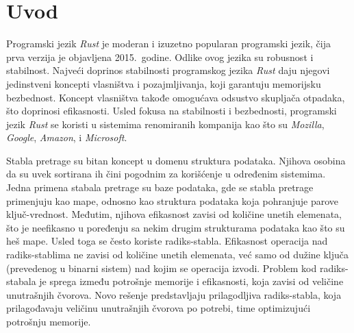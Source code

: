 \documentclass[12pt,oneside]{memoir}
\begin{document}
\frontmatter
\naslovna
\komisija
\apstrakt
\tableofcontents*

\mainmatter

\chapter{Uvod}
Programski jezik \textit{Rust} je moderan i izuzetno popularan programski jezik,
čija prva verzija je objavljena 2015.\ godine. Odlike ovog jezika su
robusnost i stabilnost. Najveći doprinos stabilnosti
programskog jezika \textit{Rust} daju
njegovi jedinstveni koncepti vlasništva i pozajmljivanja, koji garantuju
memorijsku bezbednost. Koncept vlasništva takođe
omogućava odsustvo skupljača otpadaka, što doprinosi efikasnosti.
Usled fokusa na stabilnosti i bezbednosti, programski jezik \textit{Rust}
se koristi u sistemima renomiranih kompanija kao što su
\textit{Mozilla}, \textit{Google}, \textit{Amazon},
i \textit{Microsoft}.

Stabla pretrage su bitan koncept u domenu struktura podataka.
Njihova osobina da su uvek sortirana ih čini pogodnim za korišćenje
u određenim sistemima.
Jedna primena stabala pretrage su baze podataka, gde se stabla pretrage
primenjuju kao mape, odnosno kao struktura podataka koja pohranjuje
parove ključ-vrednost.
Međutim, njihova efikasnost
zavisi od količine unetih elemenata, što je neefikasno u poređenju sa nekim
drugim strukturama podataka kao što su heš mape.
Usled toga se često koriste
radiks-stabla. Efikasnost operacija
nad radiks-stablima ne zavisi od količine unetih elemenata,
već samo od dužine ključa (prevedenog u binarni sistem) nad kojim se operacija izvodi.
Problem kod radiks-stabala je sprega između potrošnje memorije i efikasnosti,
koja zavisi od veličine unutrašnjih čvorova.
Novo rešenje predstavljaju
prilagodljiva radiks-stabla, koja prilagođavaju veličinu unutrašnjih čvorova
po potrebi, time optimizujući potrošnju memorije.
\end{document}

